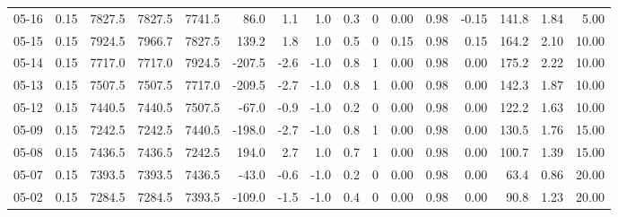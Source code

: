 \begin{threeparttable}
{\begin{tabular}{lrrrrrrrrrrrrrrr}
  05-16 &     0.15 & 7827.5 & 7827.5 & 7741.5 &       86.0 &            1.1 &                      1.0 &                 0.3 &              0 &       0.00 &      0.98 &          -0.15 &            141.8 &            1.84 &                   5.00 \\
  05-15 &     0.15 & 7924.5 & 7966.7 & 7827.5 &      139.2 &            1.8 &                      1.0 &                 0.5 &              0 &       0.15 &      0.98 &           0.15 &            164.2 &            2.10 &                  10.00 \\
  05-14 &     0.15 & 7717.0 & 7717.0 & 7924.5 &     -207.5 &           -2.6 &                     -1.0 &                 0.8 &              1 &       0.00 &      0.98 &           0.00 &            175.2 &            2.22 &                  10.00 \\
  05-13 &     0.15 & 7507.5 & 7507.5 & 7717.0 &     -209.5 &           -2.7 &                     -1.0 &                 0.8 &              1 &       0.00 &      0.98 &           0.00 &            142.3 &            1.87 &                  10.00 \\
  05-12 &     0.15 & 7440.5 & 7440.5 & 7507.5 &      -67.0 &           -0.9 &                     -1.0 &                 0.2 &              0 &       0.00 &      0.98 &           0.00 &            122.2 &            1.63 &                  10.00 \\
  05-09 &     0.15 & 7242.5 & 7242.5 & 7440.5 &     -198.0 &           -2.7 &                     -1.0 &                 0.8 &              1 &       0.00 &      0.98 &           0.00 &            130.5 &            1.76 &                  15.00 \\
  05-08 &     0.15 & 7436.5 & 7436.5 & 7242.5 &      194.0 &            2.7 &                      1.0 &                 0.7 &              1 &       0.00 &      0.98 &           0.00 &            100.7 &            1.39 &                  15.00 \\
  05-07 &     0.15 & 7393.5 & 7393.5 & 7436.5 &      -43.0 &           -0.6 &                     -1.0 &                 0.2 &              0 &       0.00 &      0.98 &           0.00 &             63.4 &            0.86 &                  20.00 \\
  05-02 &     0.15 & 7284.5 & 7284.5 & 7393.5 &     -109.0 &           -1.5 &                     -1.0 &                 0.4 &              0 &       0.00 &      0.98 &           0.00 &             90.8 &            1.23 &                  20.00 \\

\end{tabular}}
\end{threeparttable}
